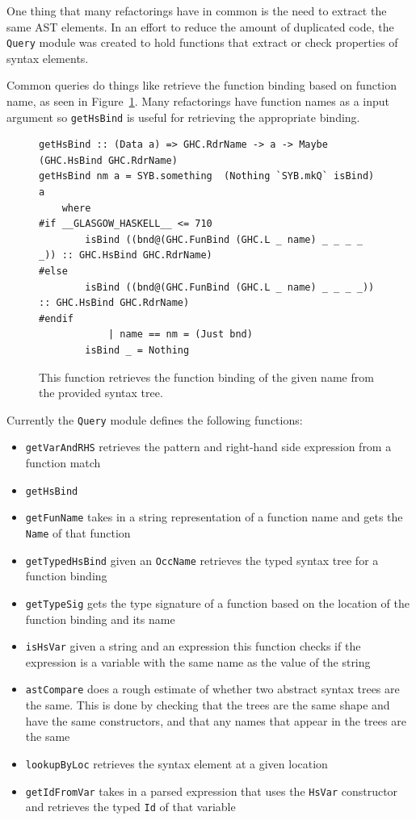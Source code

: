 One thing that many refactorings have in common is the need to extract the same AST elements. In an effort to reduce the amount of duplicated code, the \texttt{Query} module was created to hold functions that extract or check properties of syntax elements.

Common queries do things like retrieve the function binding based on function name, as seen in Figure~\ref{getHsBind}. Many refactorings have function names as a input argument so \texttt{getHsBind} is useful for retrieving the appropriate binding.

\begin{figure}[t]
\begin{lstlisting}
getHsBind :: (Data a) => GHC.RdrName -> a -> Maybe (GHC.HsBind GHC.RdrName)
getHsBind nm a = SYB.something  (Nothing `SYB.mkQ` isBind) a
    where
#if __GLASGOW_HASKELL__ <= 710
        isBind ((bnd@(GHC.FunBind (GHC.L _ name) _ _ _ _ _)) :: GHC.HsBind GHC.RdrName)
#else
        isBind ((bnd@(GHC.FunBind (GHC.L _ name) _ _ _ _)) :: GHC.HsBind GHC.RdrName)
#endif
            | name == nm = (Just bnd)
        isBind _ = Nothing
\end{lstlisting}
\caption{This function retrieves the function binding of the given name from the provided syntax tree.}
\label{getHsBind}
\end{figure}

Currently the \texttt{Query} module defines the following functions:

\begin{itemize}
\item \texttt{getVarAndRHS} retrieves the pattern and right-hand side expression from a function match
\item \texttt{getHsBind}
\item \texttt{getFunName} takes in a string representation of a function name and gets the \texttt{Name} of that function
\item \texttt{getTypedHsBind} given an \texttt{OccName} retrieves the typed syntax tree for a function binding
\item \texttt{getTypeSig} gets the type signature of a function based on the location of the function binding and its name
\item \texttt{isHsVar} given a string and an expression this function checks if the expression is a variable with the same name as the value of the string
\item \texttt{astCompare} does a rough estimate of whether two abstract syntax trees are the same. This is done by checking that the trees are the same shape and have the same constructors, and that any names that appear in the trees are the same 
\item \texttt{lookupByLoc} retrieves the syntax element at a given location
\item \texttt{getIdFromVar} takes in a parsed expression that uses the \texttt{HsVar} constructor and retrieves the typed \texttt{Id} of that variable
\end{itemize}


